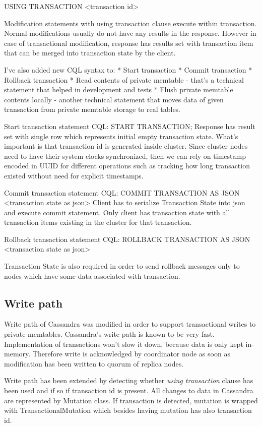 USING TRANSACTION <transaction id>


Modification statements with using transaction clause execute within transaction. 
Normal modifications usually do not have any results in the response. However in case of transactional modification, response has results set with transaction item that can be merged into transaction state by the client.


I’ve also added new CQL syntax to:
* Start transaction
* Commit transaction
* Rollback transaction
* Read contents of private memtable - that’s a technical statement that helped in development and tests
* Flush private memtable contents locally - another technical statement that moves data of given transaction from private memtable storage to real tables.


Start transaction statement
CQL:        START TRANSACTION;
Response has result set with single row which represents initial empty transaction state. 
What’s important is that transaction id is generated inside cluster. Since cluster nodes need to have their system clocks synchronized, then we can rely on timestamp encoded in UUID for different operations such as tracking how long transaction existed without need for explicit timestamps.


Commit transaction statement
CQL: COMMIT TRANSACTION AS JSON <transaction state as json>
Client has to serialize Transaction State into json and execute commit statement. Only client has transaction state with all transaction items existing in the cluster for that transaction.


Rollback transaction statement
CQL: ROLLBACK TRANSACTION AS JSON <transaction state as json>


Transaction State is also required in order to send rollback messages only to nodes which have some data associated with transaction.




\subsection{Write path}
Write path of Cassandra \cite{CassandraWritePath} was modified in order to support transactional writes to private memtables. 
Cassandra’s write path is known to be very fast. Implementation of transactions won’t slow it down, because data is only kept in-memory. Therefore write is acknowledged by coordinator node as soon as modification has been written to quorum of replica nodes.


Write path has been extended by detecting whether \emph{using transaction} clause has been used and if so if transaction id is present. All changes to data in Cassandra are represented by Mutation class. If transaction is detected, mutation is wrapped with TransactionalMutation which besides having mutation has also transaction id.


